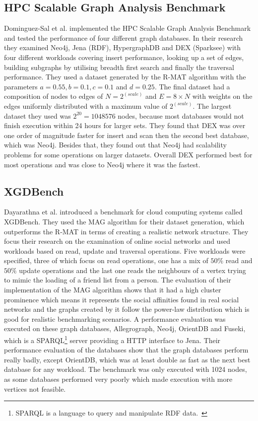 \subsection{HPC Scalable Graph Analysis Benchmark}
Dominguez-Sal et al. implemented the HPC Scalable Graph Analysis Benchmark and tested the performance of four different graph databases.
In their research they examined Neo4j, Jena (RDF), HypergraphDB and DEX (Sparksee) with four different workloads covering insert performance, looking up a set of edges, building subgraphs by utilising breadth first search and finally the traversal performance.
They used a dataset generated by the R-MAT algorithm with the parameters $ a = 0.55, b = 0.1, c = 0.1 $ and $ d = 0.25 $.
The final dataset had a composition of nodes to edges of $ N = 2^(scale) $ and $ E = 8 \times N $ with weights on the edges uniformly distributed with a maximum value of $ 2^(scale) $.
The largest dataset they used was $ 2^20 = 1048576 $ nodes,
because most databases would not finish execution within 24 hours for larger sets.
They found that DEX was over one order of magnitude faster for insert and scan then the second best database,
which was Neo4j.
Besides that,
they found out that Neo4j had scalability problems for some operations on larger datasets.
Overall DEX performed best for most operations and was close to Neo4j where it was the fastest.\cite{TaoShen}

\subsection{XGDBench}
Dayarathna et al. introduced a benchmark for cloud computing systems called XGDBench.
They used the MAG algorithm for their dataset generation,
which outperforms the R-MAT in terms of creating a realistic network structure.
They focus their research on the examination of online social networks and used workloads based on read, update and traversal operations.
Five workloads were specified, three of which focus on read operations, one has a mix of $ 50\% $ read and $ 50\% $ update operations and the last one reads the neighbours of a vertex trying to mimic the loading of a friend list from a person.
The evaluation of their implementation of the MAG algorithm shows that it had a high cluster prominence which means it represents the social affinities found in real social networks and the graphs created by it follow the power-law distribution which is good for realistic benchmarking scenarios.
A performance evaluation was executed on these graph databases,
Allegrograph, Neo4j, OrientDB and Fuseki,
which is a SPARQL\footnote{SPARQL is a language to query and manipulate RDF data.~\cite{Harris2013}} server providing a HTTP interface to Jena.
Their performance evaluation of the databases show that the graph databases perform really badly,
except OrientDB,
which was at least double as fast as the next best database for any workload.
The benchmark was only executed with 1024 nodes,
as some databases performed very poorly which made execution with more vertices not feasible.\cite{Dayarathna2012}

